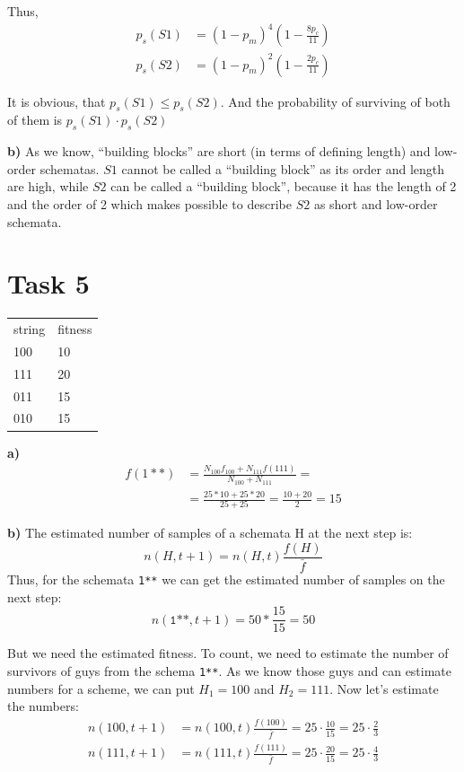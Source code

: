 \documentclass[12pt, a4paper]{article}
\begin{document}
        Thus,
        \begin{align*}
            p_s(S1) &= (1 - p_m)^4 (1 - \frac{8 p_c}{11})\\
            p_s(S2) &= (1 - p_m)^2 (1 - \frac{2 p_c}{11})
        \end{align*}

        It is obvious, that $p_s(S1) \leq p_s(S2)$. And the probability of
        surviving of both of them is $p_s(S1) \cdot p_s(S2)$

        {\bf b)} As we know, ``building blocks'' are short (in terms of defining
        length) and low-order schematas. $S1$ cannot be called a ``building
        block'' as its order and length are high, while $S2$ can be called
        a ``building block'', because it has the length of 2 and the order
        of 2 which makes possible to describe $S2$ as short and low-order
        schemata.

    \section{Task 5}
        \begin{table}[H]
        \centering
            \begin{tabular}{ll}
            \rowcolor[HTML]{C0C0C0}
            string & fitness \\
            100    & 10      \\
            111    & 20      \\
            011    & 15      \\
            010    & 15
            \end{tabular}
        \end{table}

        {\bf a)}
        \begin{align*}
            f(1**) &= \frac{N_{100} f_{100} + N_{111} f(111)}{N_{100} + N_{111}} =\\
            &= \frac{25 * 10 + 25 * 20}{25 + 25} = \frac{10 + 20}{2} = 15
        \end{align*}

        {\bf b)}
        The estimated number of samples of a schemata H at the next step is:
        $$n(H, t+1) = n(H, t) \frac{f(H)}{\bar{f}}$$
        Thus, for the schemata \texttt{1**} we can get the estimated number of samples
        on the next step:
        $$n(\texttt{1**}, t+1) = 50 * \frac{15}{15} = 50$$

        But we need the estimated fitness. To count, we need to estimate the number
        of survivors of guys from the schema \texttt{1**}. As we know those guys and can
        estimate numbers for a scheme, we can put $H_1 = 100$ and $H_2 = 111$. Now
        let's estimate the numbers:
        \begin{align*}
            n(100, t+1) &= n(100, t) \frac{f(100)}{\bar{f}} = 25 \cdot \frac{10}{15} = 25 \cdot \frac{2}{3}\\
            n(111, t+1) &= n(111, t) \frac{f(111)}{\bar{f}} = 25 \cdot \frac{20}{15} = 25 \cdot \frac{4}{3}
        \end{align*}
\end{document}
